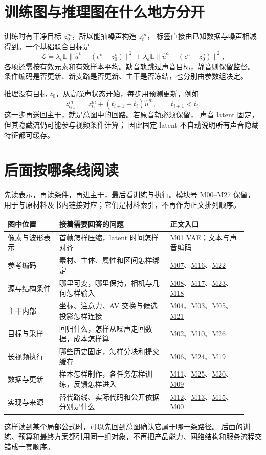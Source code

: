 \section{训练图与推理图在什么地方分开}
训练时有干净目标 $z_0^m$，所以能抽噪声构造 $z_t^m$，
标签直接由已知数据与噪声相减得到。一个基础联合目标是
\[
\mathcal L=\lambda_v\mathbb E\|\hat u^v-(\epsilon^v-z_0^v)\|^2
 +\lambda_a\mathbb E\|\hat u^a-(\epsilon^a-z_0^a)\|^2,
\]
各项还需按有效元素和有效样本平均。缺音轨跳过声音目标，静音则保留监督。
条件编码是否更新、新支路是否更新、主干是否冻结，也分别由参数组决定。

推理没有目标 $z_0$，从高噪声状态开始，每步用预测更新，例如
\[
z_{t_{i+1}}^m=z_{t_i}^m+(t_{i+1}-t_i)\hat u^m,
\qquad t_{i+1}<t_i.
\]
这一步再送回主干，就是总图中的回路。若原音轨必须保留，
声音 latent 固定，但其隐藏流仍可能参与视频条件计算；
因此固定 latent 不自动说明所有声音隐藏特征都可缓存。

\section{后面按哪条线阅读}
先读表示，再读条件，再进主干，最后看训练与执行。模块号 M00--M27 保留，
用于与原材料及书内链接对应；它们是材料索引，不再作为正文排列顺序。

\begin{longtable}{@{}p{0.20\linewidth}p{0.43\linewidth}p{0.30\linewidth}@{}}
\toprule 图中位置 & 接着需要回答的问题 & 正文入口\\\midrule
\endhead
像素与波形表示 & 首帧怎样压缩，latent 时间怎样对齐 & \hyperref[seedance-m01]{M01 VAE}；\hyperref[seedance-encoders]{文本与声音编码}\\
参考编码 & 素材、主体、属性和区间怎样绑定 & \hyperref[seedance-m07]{M07}、\hyperref[seedance-m16]{M16}、\hyperref[seedance-m22]{M22}\\
源与结构条件 & 哪里可变，哪里保持，相机与几何怎样输入 & \hyperref[seedance-m08]{M08}、\hyperref[seedance-m17]{M17}、\hyperref[seedance-m23]{M23}、\hyperref[seedance-m18]{M18}\\
主干内部 & 坐标、注意力、AV 交换与候选投影怎样连接 & \hyperref[seedance-m04]{M04}、\hyperref[seedance-m03]{M03}、\hyperref[seedance-m05]{M05}、\hyperref[seedance-m21]{M21}\\
目标与采样 & 回归什么，怎样从噪声走回数据，成本怎样算 & \hyperref[seedance-m02]{M02}、\hyperref[seedance-m10]{M10}、\hyperref[seedance-m26]{M26}\\
长视频执行 & 哪些历史固定，怎样分块和提交缓存 & \hyperref[seedance-m06]{M06}、\hyperref[seedance-m24]{M24}、\hyperref[seedance-m19]{M19}\\
数据与更新 & 样本怎样制作，各任务怎样训练，反馈怎样进入 & \hyperref[seedance-m11]{M11}、\hyperref[seedance-m25]{M25}、\hyperref[seedance-m20]{M20}、\hyperref[seedance-m09]{M09}\\
实现与来源 & 替代路线、实际代码和公开依据分别是什么 & \hyperref[seedance-m12]{M12}、\hyperref[seedance-m13]{M13}、\hyperref[seedance-m15]{M15}、\hyperref[seedance-m00]{M00}\\
\bottomrule
\end{longtable}

这样读到某个局部公式时，可以先回到总图确认它属于哪一条路径。
后面的训练、预算和最终方案都引用同一组对象，不再把产品能力、网络结构和服务流程交错成一套顺序。
